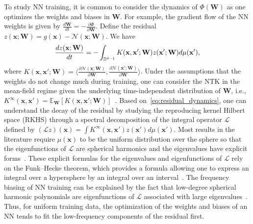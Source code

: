 \documentclass{article} %
\begin{document}
To study NN training, it is common to consider the dynamics of $\Phi(\mathbf{W})$ as one optimizes the weights and biases in $\mathbf{W}$. For example, the gradient flow of the NN weights is given by $\frac{d\mathbf{W}}{dt} = - \frac{\partial \Phi}{\partial \mathbf{W}}$. Define the residual $z(\mathbf{x};\mathbf{W}) =  g(\mathbf{x}) - \mathcal{N}(\mathbf{x};\mathbf{W}) $. We have%
\begin{equation}\label{eq:residual_dynamics}
    \frac{d z(\mathbf{x};\mathbf{W}) }{dt} = -  \int_{{\mathbb{S}}^{d-1}} K(\mathbf{x},\mathbf{x}';\mathbf{W}) z(\mathbf{x}';\mathbf{W}) d\mu(\mathbf{x}'),
\end{equation}
where $K(\mathbf{x},\mathbf{x}';\mathbf{W}) = \big  \langle \frac{\partial \mathcal{N}(\mathbf{x};\mathbf{W}) }{\partial \mathbf{W}},\frac{ \partial \mathcal{N}(\mathbf{x}';\mathbf{W})}{\partial \mathbf{W}}  \big \rangle$. Under the assumptions that the weights do not change much during training, one can consider the NTK in the mean-field regime given the underlying time-independent distribution of $\mathbf{W}$, i.e., $K^\infty(\mathbf{x},\mathbf{x}') = \mathbb{E}_\mathbf{W} [K(\mathbf{x},\mathbf{x}';\mathbf{W})]$~\citep{du}. Based on~\cref{eq:residual_dynamics}, one can understand the decay of the residual by studying the reproducing kernel Hilbert space (RKHS)
through a spectral decomposition of the integral operator $\mathcal{L}$ defined by $(\mathcal{L} z)(\mathbf{x}) = \int K^\infty(\mathbf{x},\mathbf{x}') z(\mathbf{x}') d\mu(\mathbf{x}')$. 
Most results in the literature require $\mu(\mathbf{x})$ to be the uniform distribution over the sphere so that the eigenfunctions of $\mathcal{L}$ are spherical harmonics and the eigenvalues have explicit forms~\citep{cao2019towards,basri,scetbon2021spectral}. These explicit formulas for the eigenvalues and eigenfunctions of $\mathcal{L}$ rely on the Funk--Hecke theorem, which provides a formula allowing one to express an integral over a hypersphere by an integral over an interval~\citep{seeley1966spherical}.  The frequency biasing of NN training can be explained by the fact that low-degree spherical harmonic polynomials are eigenfunctions of $\mathcal{L}$ associated with large eigenvalues~\citep{basri}. Thus, for uniform training data, the optimization of the weights and biases of an NN tends to fit the low-frequency components of the residual first.
\end{document}
